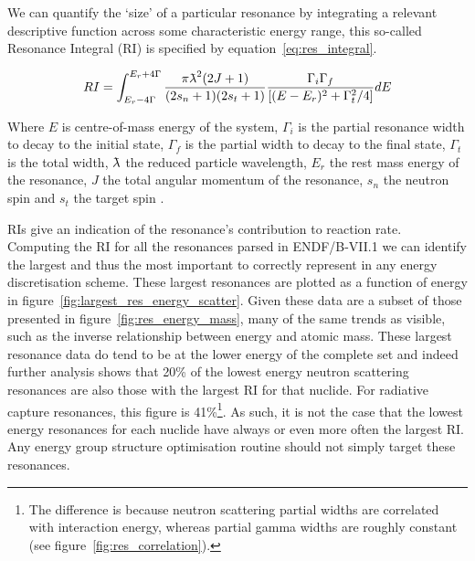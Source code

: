 
We can quantify the `size' of a particular resonance by integrating a relevant descriptive function across some characteristic energy range, this so-called Resonance Integral (RI) is specified by equation~\ref{eq:res_integral}. 

\begin{equation}
  \label{eq:res_integral}
  RI = \int_{E_{r}-4\Gamma}^{E_{r}+4\Gamma} \frac{\pi\lambdabar^{2}(2J + 1)}{(2s_{n} + 1)(2s_{t} + 1)}  \frac{\Gamma_{i}\Gamma_{f}}{[(E-E_{r})^{2} + \Gamma^{2}_{t}/4]} dE
\end{equation}

Where $E$ is centre-of-mass energy of the system, $\Gamma_{i}$ is the partial resonance width to decay to the initial state, $\Gamma_{f}$ is the partial width to decay to the final state, $\Gamma_{t}$ is the total width, $\lambdabar$ the reduced particle wavelength, $E_{r}$ the rest mass energy of the resonance, $J$ the total angular momentum of the resonance, $s_{n}$ the neutron spin and $s_{t}$ the target spin \cite{Libby2005}. 


RIs give an indication of the resonance's contribution to reaction rate. Computing the RI for all the resonances parsed in ENDF/B-VII.1 we can identify the largest and thus the most important to correctly represent in any energy discretisation scheme. These largest resonances are plotted as a function of energy in figure~\ref{fig:largest_res_energy_scatter}. Given these data are a subset of those presented in figure~\ref{fig:res_energy_mass}, many of the same trends as visible, such as the inverse relationship between energy and atomic mass. These largest resonance data do tend to be at the lower energy of the complete set and indeed further analysis shows that 20\% of the lowest energy neutron scattering resonances are also those with the largest RI for that nuclide. For radiative capture resonances, this figure is 41\%\footnote{The difference is because neutron scattering partial widths are correlated with interaction energy, whereas partial gamma widths are roughly constant (see figure~\ref{fig:res_correlation}).}. As such, it is not the case that the lowest energy resonances for each nuclide have always or even more often the largest RI. Any energy group structure optimisation routine should not simply target these resonances.

